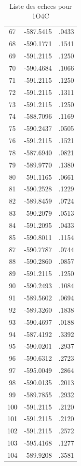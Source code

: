 \documentclass[a4paper,12pt]{article}
\begin{document}
\begin{table}[!htbp]
\begin{tabular}{|c|c|c|}
        67 & -587.5415 & .0433 \\
        68 & -590.1771 & .1541 \\
        69 & -591.2115 & .1250 \\
        70 & -590.4684 & .1066 \\
        71 & -591.2115 & .1250 \\
        72 & -591.2115 & .1311 \\
        73 & -591.2115 & .1250 \\
        74 & -588.7096 & .1169 \\
        75 & -590.2437 & .0505 \\
        76 & -591.2115 & .1521 \\
        78 & -587.6940 & .0821 \\
        79 & -589.9770 & .1380 \\
        80 & -591.1165 & .0661 \\
        81 & -590.2528 & .1229 \\
        82 & -589.8459 & .0724 \\
        83 & -590.2079 & .0513 \\
        84 & -591.2095 & .0433 \\
        85 & -590.8011 & .1154 \\
        87 & -590.7787 & .0744 \\
        88 & -590.2860 & .0857 \\
        89 & -591.2115 & .1250 \\
        90 & -590.2493 & .1084 \\
        91 & -589.5602 & .0694 \\
        92 & -589.3260 & .1838 \\
        93 & -590.4697 & .0188 \\
        94 & -587.4192 & .3392 \\
        95 & -590.0201 & .2937 \\
        96 & -590.6312 & .2723 \\
        97 & -595.0049 & .2864 \\
        98 & -590.0135 & .2013 \\
        99 & -589.7855 & .2932 \\
        100 & -591.2115 & .2120 \\
        101 & -591.2115 & .2120 \\
        102 & -591.2115 & .2572 \\
        103 & -595.4168 & .1277 \\
        104 & -589.9208 & .3581 \\
        
        \hline


      \end{tabular}      
      \caption{Liste des echecs pour 1O4C}
      \label{tab_echec1O4C__1}      
    \end{table}
\end{document}
